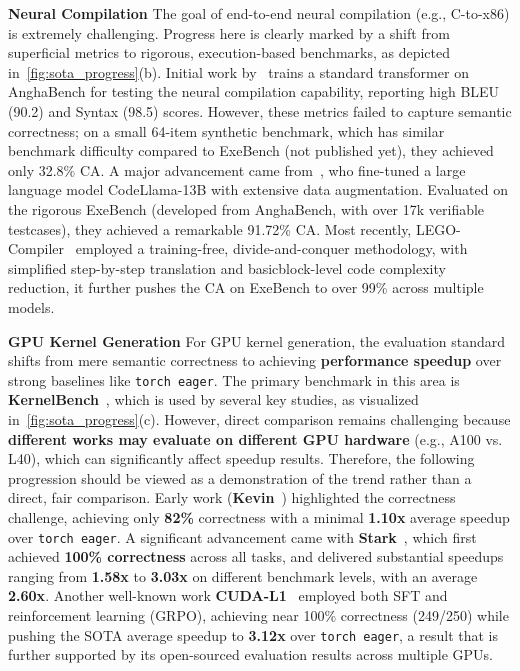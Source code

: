 \documentclass[pdflatex,sn-mathphys-ay,twocolumn, a4paper]{sn-jnl}%
\theoremstyle{thmstyleone}%
\theoremstyle{thmstyletwo}%
\theoremstyle{thmstylethree}%
\begin{document}
    \textbf{Neural Compilation}
    The goal of end-to-end neural compilation (e.g., C-to-x86) is extremely challenging. Progress here is clearly marked by a shift from superficial metrics to rigorous, execution-based benchmarks, as depicted in~\autoref{fig:sota_progress}(b). Initial work by~\citet{39_armengol-estape2021learning} trains a standard transformer on AnghaBench for testing the neural compilation capability, reporting high BLEU (90.2) and Syntax (98.5) scores. However, these metrics failed to capture semantic correctness; on a small 64-item synthetic benchmark, which has similar benchmark difficulty compared to ExeBench (not published yet), they achieved only 32.8\% CA. 
    A major advancement came from~\citet{70_c-x86-emnlp24}, who fine-tuned a large language model CodeLlama-13B with extensive data augmentation. Evaluated on the rigorous ExeBench (developed from AnghaBench, with over 17k verifiable testcases), they achieved a remarkable 91.72\% CA. Most recently, LEGO-Compiler~\citep{5_legocompiler-arxiv25} employed a training-free, divide-and-conquer methodology, with simplified step-by-step translation and basicblock-level code complexity reduction, it further pushes the CA on ExeBench to over 99\% across multiple models.

    \textbf{GPU Kernel Generation}
    For GPU kernel generation, the evaluation standard shifts from mere semantic correctness to achieving \textbf{performance speedup} over strong baselines like \texttt{torch eager}. The primary benchmark in this area is \textbf{KernelBench}~\citep{kernelbench_2025_icml}, which is used by several key studies, as visualized in~\autoref{fig:sota_progress}(c).
    However, direct comparison remains challenging because \textbf{different works may evaluate on different GPU hardware} (e.g., A100 vs. L40), which can significantly affect speedup results. Therefore, the following progression should be viewed as a demonstration of the trend rather than a direct, fair comparison.
    Early work (\textbf{Kevin}~\citep{kevin2025arxiv}) highlighted the correctness challenge, achieving only \textbf{82\%} correctness with a minimal \textbf{1.10x} average speedup over \texttt{torch eager}. A significant advancement came with \textbf{Stark}~\citep{stark2025arxiv}, which first achieved \textbf{100\% correctness} across all tasks, and delivered substantial speedups ranging from \textbf{1.58x} to \textbf{3.03x} on different benchmark levels, with an average \textbf{2.60x}. Another well-known work \textbf{CUDA-L1}~\citep{cudal1_2025_arxiv} employed both SFT and reinforcement learning (GRPO), achieving near 100\% correctness (249/250) while pushing the SOTA average speedup to \textbf{3.12x} over \texttt{torch eager}, a result that is further supported by its open-sourced evaluation results across multiple GPUs.
\end{document}

